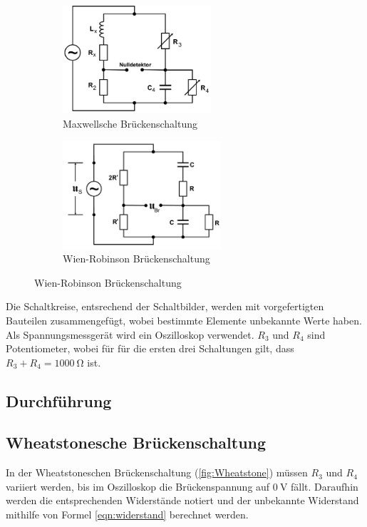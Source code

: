 \begin{figure}
    \begin{subfigure}{0.5\textwidth}
        \centering
        \includegraphics[height=4cm]{Bilder/Maxwell}
        \caption{Maxwellsche Brückenschaltung}
        \label{fig:Maxwell}
    \end{subfigure}
    \begin{subfigure}{0.5\textwidth}
        \centering
        \includegraphics[height=4cm]{Bilder/Wien-Robinson}
        \caption{Wien-Robinson Brückenschaltung}
        \label{fig:Wien}
    \end{subfigure}
\end{figure}

\noindent Die Schaltkreise, entsrechend der Schaltbilder, werden%
mit vorgefertigten Bauteilen zusammengefügt, wobei bestimmte Elemente unbekannte Werte haben.
Als Spannungsmessgerät wird ein Oszilloskop verwendet. $R_3$ und $R_4$ sind Potentiometer, wobei für
für die ersten drei Schaltungen gilt, dass $R_3+R_4=\qty{1000}{\ohm}$ ist.

\subsection{Durchführung}

\subsection{Wheatstonesche Brückenschaltung}
In der Wheatstoneschen Brückenschaltung (\ref{fig:Wheatstone}) müssen $R_3$ und $R_4$ variiert werden, 
bis im Oszilloskop die Brückenspannung auf $\qty{0}{\volt}$ fällt. Daraufhin werden die entsprechenden Widerstände
notiert und der unbekannte Widerstand mithilfe von Formel \ref{eqn:widerstand} berechnet werden.

